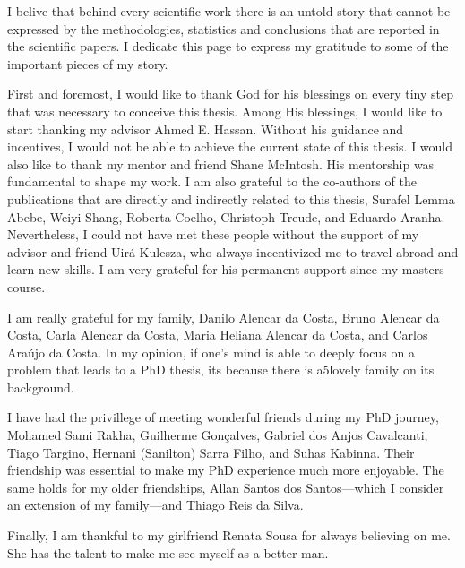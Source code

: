 \begin{agradecimentos}

	I belive that behind every scientific work there is an untold story that
	cannot be expressed by the methodologies, statistics and conclusions
	that are reported in the scientific papers. I dedicate this page to
	express my gratitude to some of the important pieces of my story.

	First and foremost, I would like to thank God for his blessings on every
	tiny step that was necessary to conceive this thesis. Among His
	blessings, I would like to start thanking my advisor Ahmed E. Hassan.
	Without his guidance and incentives, I would not be able to achieve the
	current state of this thesis. I would also like to thank my mentor and
	friend Shane McIntosh. His mentorship was fundamental to shape my work.
	I am also grateful to the co-authors of the publications that are
	directly and indirectly related to this thesis, Surafel Lemma Abebe,
	Weiyi Shang, Roberta Coelho, Christoph Treude, and Eduardo Aranha.
	Nevertheless, I could not have met these people without the support of
	my advisor and friend Uir\'{a} Kulesza, who always incentivized me to
	travel abroad and learn new skills. I am very grateful for his permanent
	support since my masters course.

	I am really grateful for my family, Danilo Alencar da Costa, Bruno
	Alencar da Costa, Carla Alencar da Costa, Maria Heliana Alencar da
	Costa, and Carlos Ara\'{u}jo da Costa. In my opinion, if one's mind is
	able to deeply focus on a problem that leads to a PhD thesis, its
	because there is a5lovely family on its background.

	I have had the privillege of meeting wonderful friends during my PhD
	journey, Mohamed Sami Rakha, Guilherme Gon\c{c}alves, Gabriel dos Anjos
	Cavalcanti, Tiago Targino, Hernani (Sanilton) Sarra Filho, and Suhas
	Kabinna. Their friendship was essential to make my PhD experience much
	more enjoyable.  The same holds for my older friendships, Allan Santos
	dos Santos---which I consider an extension of my family---and Thiago
	Reis da Silva. 

	Finally, I am thankful to my girlfriend Renata Sousa for always
	believing on me. She has the talent to make me see myself as a better
	man.

\end{agradecimentos}


